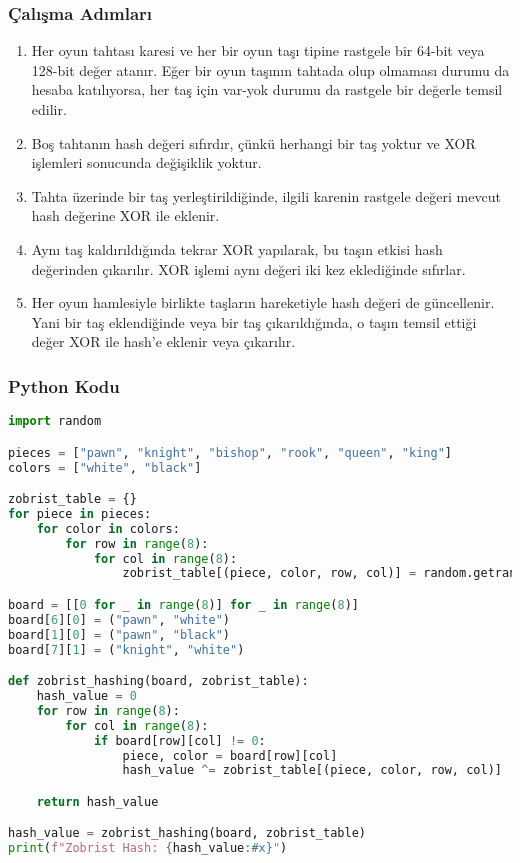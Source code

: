 \subsubsection{Çalışma Adımları}

\begin{enumerate}
    \item Her oyun tahtası karesi ve her bir oyun taşı tipine rastgele bir 64-bit veya 128-bit değer atanır. Eğer bir oyun taşının tahtada olup olmaması durumu da hesaba katılıyorsa, her taş için var-yok durumu da rastgele bir değerle temsil edilir.
    \item Boş tahtanın hash değeri sıfırdır, çünkü herhangi bir taş yoktur ve XOR işlemleri sonucunda değişiklik yoktur.
    \item Tahta üzerinde bir taş yerleştirildiğinde, ilgili karenin rastgele değeri mevcut hash değerine XOR ile eklenir. 
    \item Aynı taş kaldırıldığında tekrar XOR yapılarak, bu taşın etkisi hash değerinden çıkarılır. XOR işlemi aynı değeri iki kez eklediğinde sıfırlar.
    \item Her oyun hamlesiyle birlikte taşların hareketiyle hash değeri de güncellenir. Yani bir taş eklendiğinde veya bir taş çıkarıldığında, o taşın temsil ettiği değer XOR ile hash'e eklenir veya çıkarılır.
\end{enumerate}

\subsubsection{Python Kodu}

\begin{lstlisting}[language=Python]
import random

pieces = ["pawn", "knight", "bishop", "rook", "queen", "king"]
colors = ["white", "black"]

zobrist_table = {}
for piece in pieces:
    for color in colors:
        for row in range(8):
            for col in range(8):
                zobrist_table[(piece, color, row, col)] = random.getrandbits(64)

board = [[0 for _ in range(8)] for _ in range(8)]
board[6][0] = ("pawn", "white")
board[1][0] = ("pawn", "black")
board[7][1] = ("knight", "white")

def zobrist_hashing(board, zobrist_table):
    hash_value = 0
    for row in range(8):
        for col in range(8):
            if board[row][col] != 0:
                piece, color = board[row][col]
                hash_value ^= zobrist_table[(piece, color, row, col)]

    return hash_value

hash_value = zobrist_hashing(board, zobrist_table)
print(f"Zobrist Hash: {hash_value:#x}")
\end{lstlisting}

